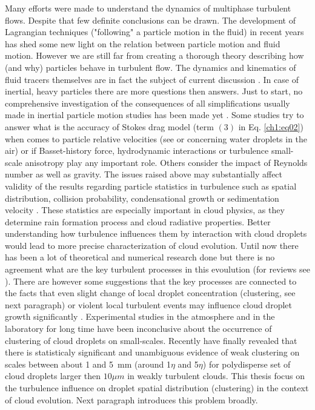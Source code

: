 \documentclass[../main.tex]{subfiles}
\begin{document}
Many efforts were made to understand the dynamics of multiphase turbulent flows. Despite that few definite conclusions can be drawn. The development of Lagrangian techniques ("following" a particle motion in the fluid) in recent years has shed some new light on the relation between particle motion and fluid motion. However we are still far from creating a thorough theory describing how (and why) particles behave in turbulent flow. The dynamics and kinematics of fluid tracers themselves are in fact the subject of current discussion \citep{Biferale2005,Arneodo2008, Toschi2009,Scatamacchia2012,Dhariwal2018}. In case of inertial, heavy particles there are more questions then answers. Just to start, no comprehensive investigation of the consequences of all simplifications usually made in inertial particle motion studies has been made yet \citep{Bourgoin2014}. Some studies try to answer what is the accuracy of Stokes drag model (term $(3)$ in Eq. \ref{ch1:eq02}) when comes to particle relative velocities (see \citet{Dou2018} or \citet{Saw2014} concerning water droplets in the air) or if Basset-history force,  hydrodynamic interactions or turbulence small-scale anisotropy play any important role. Others consider the impact of Reynolds number as well as gravity\citep{Ireland2016a, Ireland2016b}. The issues raised above may substantially affect validity of the results regarding particle statistics in turbulence such as spatial distribution, collision probability, condensational growth or sedimentation velocity \citep{Chen2018}. These statistics are especially important in cloud physics, as they determine rain formation process and cloud radiative properties. Better understanding how turbulence influences them by interaction with cloud droplets would lead to more precise characterization of cloud evolution\citep{Bodenschatz2010}. Until now there has been a lot of theoretical and numerical research done but there is no agreement what are the key turbulent processes in this evoulution (for reviews see \citet{Vaillancourt2000, Shaw2003, Devenish2012, Grabowski2013, Pumir2016, Saito2018}). There are however some suggestions that the key processes are connected to the facts that even slight change of local droplet concentration (clustering, see next paragraph) or violent local turbulent events may influence cloud droplet growth significantly \citep{Kostinski2005, Bec2016, Madival2019}. Experimental studies in the atmosphere \citep{Chaumat2001, Pinsky2001, Kostinski2001, Shaw2002, Knyazikhin2005, Marshak2005, Lehmann2007, Glienke2017} and in the laboratory \citep{Jaczewski2005, Warhaft2008} for long time have been inconclusive about the occurrence of clustering of cloud droplets on small-scales. Recently \citet{Larsen2018} have finally revealed that there is statisticaly significant and unambiguous evidence of weak clustering on scales between about 1 and 5~mm (around 1$\eta$ and 5$\eta$) for polydisperse set of cloud droplets larger then $10\mu m$ in weakly turbulent clouds. This thesis focus on the turbulence influence on droplet spatial distribution (clustering) in the context of cloud evolution. Next paragraph introduces this problem broadly.\\
\end{document}
